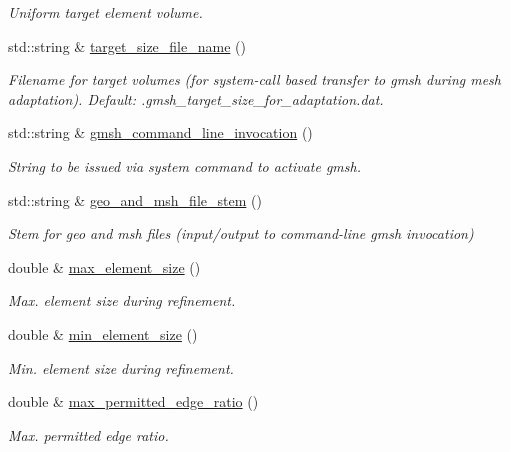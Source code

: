 \begin{DoxyCompactItemize}
\begin{DoxyCompactList}\small\item\em Uniform target element volume. \end{DoxyCompactList}\item 
std\+::string \& \hyperlink{classoomph_1_1GmshParameters_a89c7ff40c1dd70b20b0ae22d30fe5c8a}{target\+\_\+size\+\_\+file\+\_\+name} ()
\begin{DoxyCompactList}\small\item\em Filename for target volumes (for system-\/call based transfer to gmsh during mesh adaptation). Default\+: .gmsh\+\_\+target\+\_\+size\+\_\+for\+\_\+adaptation.\+dat. \end{DoxyCompactList}\item 
std\+::string \& \hyperlink{classoomph_1_1GmshParameters_aaf19a5b331893637974f5a5be8da048c}{gmsh\+\_\+command\+\_\+line\+\_\+invocation} ()
\begin{DoxyCompactList}\small\item\em String to be issued via system command to activate gmsh. \end{DoxyCompactList}\item 
std\+::string \& \hyperlink{classoomph_1_1GmshParameters_ab9ae54d3d474392b5aefcf2a12aae1a8}{geo\+\_\+and\+\_\+msh\+\_\+file\+\_\+stem} ()
\begin{DoxyCompactList}\small\item\em Stem for geo and msh files (input/output to command-\/line gmsh invocation) \end{DoxyCompactList}\item 
double \& \hyperlink{classoomph_1_1GmshParameters_afd08195fd9f804b7ced23728b6a63e15}{max\+\_\+element\+\_\+size} ()
\begin{DoxyCompactList}\small\item\em Max. element size during refinement. \end{DoxyCompactList}\item 
double \& \hyperlink{classoomph_1_1GmshParameters_a4afd4f1f72b1f45b3ca51b186737f264}{min\+\_\+element\+\_\+size} ()
\begin{DoxyCompactList}\small\item\em Min. element size during refinement. \end{DoxyCompactList}\item 
double \& \hyperlink{classoomph_1_1GmshParameters_afe2deda55a1eb76d4f782aab9a58089c}{max\+\_\+permitted\+\_\+edge\+\_\+ratio} ()
\begin{DoxyCompactList}\small\item\em Max. permitted edge ratio. \end{DoxyCompactList}\item 

\end{DoxyCompactItemize}
